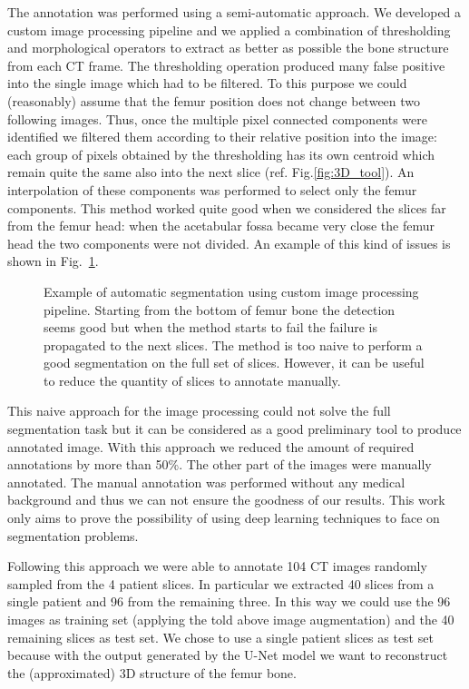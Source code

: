 \documentclass{standalone}
\begin{document}
The annotation was performed using a semi-automatic approach.
We developed a custom image processing pipeline and we applied a combination of thresholding and morphological operators to extract as better as possible the bone structure from each CT frame.
The thresholding operation produced many false positive into the single image which had to be filtered.
To this purpose we could (reasonably) assume that the femur position does not change between two following images.
Thus, once the multiple pixel connected components were identified we filtered them according to their relative position into the image: each group of pixels obtained by the thresholding has its own centroid which remain quite the same also into the next slice (ref. Fig.\ref{fig:3D_tool}).
An interpolation of these components was performed to select only the femur components.
This method worked quite good when we considered the slices far from the femur head: when the acetabular fossa became very close the femur head the two components were not divided.
An example of this kind of issues is shown in Fig.~\ref{fig:seg_tool}.

\begin{figure}[htbp]
\centering
\def\svgwidth{0.85\textwidth}

\caption{Example of automatic segmentation using custom image processing pipeline.
Starting from the bottom of femur bone the detection seems good but when the method starts to fail the failure is propagated to the next slices.
The method is too naive to perform a good segmentation on the full set of slices.
However, it can be useful to reduce the quantity of slices to annotate manually.
}
\label{fig:seg_tool}
\end{figure}

This naive approach for the image processing could not solve the full segmentation task but it can be considered as a good preliminary tool to produce annotated image.
With this approach we reduced the amount of required annotations by more than 50\%.
The other part of the images were manually annotated.
The manual annotation was performed without any medical background and thus we can not ensure the goodness of our results.
This work only aims to prove the possibility of using deep learning techniques to face on segmentation problems.

Following this approach we were able to annotate 104 CT images randomly sampled from the 4 patient slices.
In particular we extracted 40 slices from a single patient and 96 from the remaining three.
In this way we could use the 96 images as training set (applying the told above image augmentation) and the 40 remaining slices as test set.
We chose to use a single patient slices as test set because with the output generated by the U-Net model we want to reconstruct the (approximated) 3D structure of the femur bone.
\end{document}
